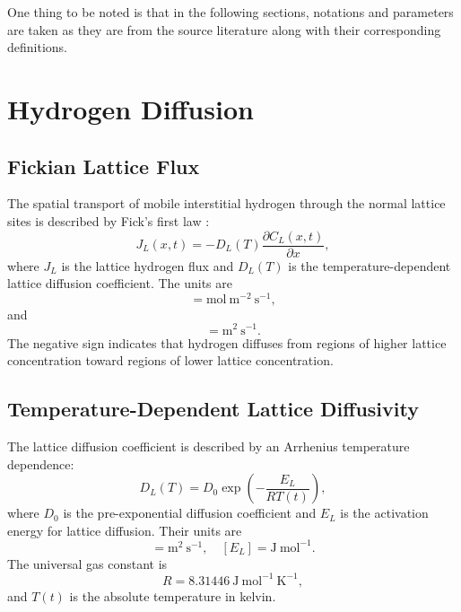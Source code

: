 \documentclass[a4paper,12pt,oneside]{report}
\begin{document}
One thing to be noted is that in the following sections, notations and parameters are taken as they are from the source literature along with their corresponding definitions.

\section{Hydrogen Diffusion}

\subsection{Fickian Lattice Flux}
The spatial transport of mobile interstitial hydrogen through the normal lattice sites is described by Fick's first law \cite{Fallahmohammadi2013,Legrand2015,MartinezPaneda2020}:
\begin{equation}
J_L(x, t) = -D_L(T) \frac{\partial C_L(x, t)}{\partial x},
\label{eq:ch3_JL}
\end{equation}
where $J_L$ is the lattice hydrogen flux and $D_L(T)$ is the temperature-dependent lattice diffusion coefficient.
The units are
\begin{equation}
[J_L] = \mathrm{mol~m^{-2}~s^{-1}},
\label{eq:ch3_JL_units}
\end{equation}
and
\begin{equation}
[D_L] = \mathrm{m^2~s^{-1}}.
\label{eq:ch3_DL_units}
\end{equation}
The negative sign indicates that hydrogen diffuses from regions of higher lattice concentration toward regions of lower lattice concentration.

\subsection{Temperature-Dependent Lattice Diffusivity}
The lattice diffusion coefficient is described by an Arrhenius temperature dependence:
\begin{equation}
D_L(T) = D_0 \exp\left( -\frac{E_L}{RT(t)} \right),
\label{eq:ch3_DL}
\end{equation}
where $D_0$ is the pre-exponential diffusion coefficient and $E_L$ is the activation energy for lattice diffusion. Their units are
\begin{equation}
[D_0] = \mathrm{m^2~s^{-1}}, \quad [E_L] = \mathrm{J~mol^{-1}}.
\label{eq:ch3_D0_units}
\end{equation}
The universal gas constant is
\begin{equation}
R = 8.31446 \mathrm{~J~mol^{-1}~K^{-1}},
\label{eq:ch3_R}
\end{equation}
and $T(t)$ is the absolute temperature in kelvin.
\end{document}

